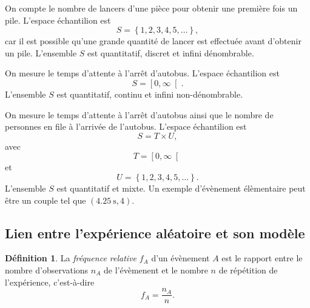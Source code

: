 \documentclass[11pt]{article}
\makeatletter
\theoremstyle{remark}
\theoremstyle{definition}
\newtheorem*{@definition}{Définition}
\newenvironment{definition}{%
	\begin{@definition}%
}{%
	\end{@definition}%
	\setcounter{property}{0}%
}
\makeatother
\begin{document}
\begin{exemple}
	On compte le nombre de lancers d'une pièce pour obtenir une première fois
	un pile. L'espace échantilion est
	\begin{equation*}
		S=\left\{1,2,3,4,5,\dots\right\},
	\end{equation*}
	car il est possible qu'une grande quantité de lancer est effectuée avant
	d'obtenir un pile. L'ensemble $S$ est quantitatif, discret et
	infini dénombrable.
\end{exemple}

\pagebreak
\begin{exemple}
	On mesure le temps d'attente à l'arrêt d'autobus. L'espace échantilion est
	\begin{equation*}
		S=\left[0,\infty\right[.
	\end{equation*}
	L'ensemble $S$ est quantitatif, continu et infini non-dénombrable.
\end{exemple}

\begin{exemple}
	On mesure le temps d'attente à l'arrêt d'autobus ainsi que le nombre de
	personnes en file à l'arrivée de l'autobus. L'espace échantilion est
	\begin{equation*}
		S=T\times U,
	\end{equation*}
	avec
	\begin{equation*}
		T=\left[0,\infty\right[
	\end{equation*}
	et
	\begin{equation*}
		U=\left\{1,2,3,4,5,\dots\right\}.
	\end{equation*}
	L'ensemble $S$ est quantitatif et mixte. Un exemple d'évènement élèmentaire
	peut être un couple tel que $\left(\SI{4.25}{\second}, 4\right)$.
\end{exemple}

\subsection{Lien entre l'expérience aléatoire et son modèle}
\begin{definition}
	La \textit{fréquence relative} $f_A$ d'un évènement $A$ est le rapport
	entre le nombre d'observations $n_A$ de l'évèmenent et le nombre $n$ de
	répétition de l'expérience, c'est-à-dire
	\begin{equation*}
		f_A=\frac{n_A}{n}.
	\end{equation*}

\end{definition}
\end{document}
